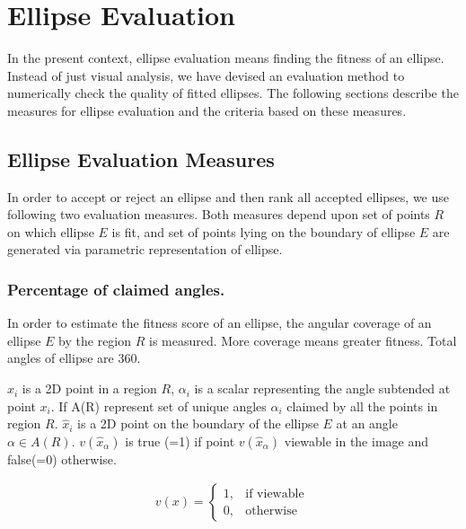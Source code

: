 \documentclass[preprint]{iucr}              %
\begin{document}
\section{Ellipse Evaluation} \label{sec:ellipseEval}
In the present context, ellipse evaluation means finding the fitness of an ellipse. Instead of just visual analysis, we have devised an evaluation method to numerically check the quality of fitted ellipses. The following sections describe the measures for ellipse evaluation and the criteria based on these measures.

\subsection{Ellipse Evaluation Measures} \label{sec:evalMeasures}
In order to accept or reject an ellipse and then rank all accepted ellipses, we use following two evaluation measures. Both measures depend upon set of points $R$ on which ellipse $E$ is fit, and set of points lying on the boundary of ellipse $E$ are generated via parametric representation of ellipse.

\subsubsection{Percentage of claimed angles.}
In order to estimate the fitness score of an ellipse, the angular coverage of an ellipse $E$ by the region $R$ is measured. More coverage means greater fitness. Total angles of ellipse are 360.

$x_i$ is a 2D point in a region $R$, $\alpha_i$ is a scalar representing the angle subtended at point $x_i$. If A(R) represent set of unique angles $\alpha_i$ claimed by all the points in region $R$. $\hat{x}_i$ is a 2D point on the boundary of the ellipse $E$ at an angle $\alpha \in A(R)$.
$v(\hat{x}_\alpha)$ is true (=1) if point $v(\hat{x}_\alpha)$ viewable in the image and false(=0) otherwise. 

\begin{align}
v(x) = 
\begin{cases}
      1, & \text{if viewable}\  \\
      0, & \text{otherwise}
\end{cases}      
\end{align}
\end{document}
